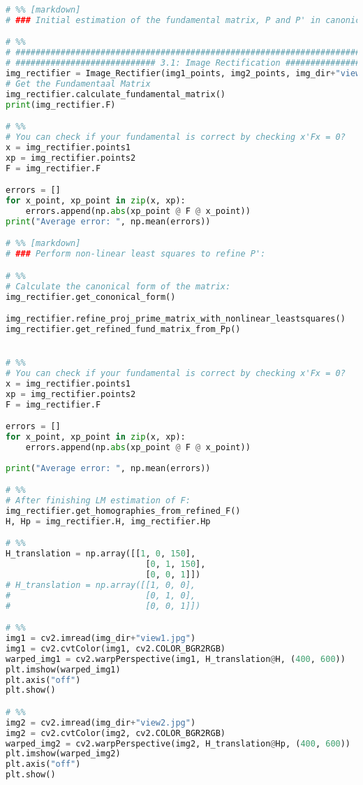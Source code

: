 \documentclass{article}
\begin{document}
\begin{lstlisting}[language=Python]
# %% [markdown]
# ### Initial estimation of the fundamental matrix, P and P' in canonical form

# %%
# ################################################################################################
# ############################ 3.1: Image Rectification ##########################################
img_rectifier = Image_Rectifier(img1_points, img2_points, img_dir+"view1.jpg", img_dir+"view2.jpg")
# Get the Fundamentaal Matrix
img_rectifier.calculate_fundamental_matrix()
print(img_rectifier.F)

# %%
# You can check if your fundamental is correct by checking x'Fx = 0?
x = img_rectifier.points1
xp = img_rectifier.points2
F = img_rectifier.F

errors = []
for x_point, xp_point in zip(x, xp):
    errors.append(np.abs(xp_point @ F @ x_point))
print("Average error: ", np.mean(errors))

# %% [markdown]
# ### Perform non-linear least squares to refine P':

# %%
# Calculate the canonical form of the matrix:
img_rectifier.get_cononical_form()

img_rectifier.refine_proj_prime_matrix_with_nonlinear_leastsquares()
img_rectifier.get_refined_fund_matrix_from_Pp()


# %%
# You can check if your fundamental is correct by checking x'Fx = 0?
x = img_rectifier.points1
xp = img_rectifier.points2
F = img_rectifier.F

errors = []
for x_point, xp_point in zip(x, xp):
    errors.append(np.abs(xp_point @ F @ x_point))
    
print("Average error: ", np.mean(errors))

# %%
# After finishing LM estimation of F:
img_rectifier.get_homographies_from_refined_F()
H, Hp = img_rectifier.H, img_rectifier.Hp

# %%
H_translation = np.array([[1, 0, 150],
                            [0, 1, 150],
                            [0, 0, 1]])
# H_translation = np.array([[1, 0, 0],
#                           [0, 1, 0],
#                           [0, 0, 1]])

# %%
img1 = cv2.imread(img_dir+"view1.jpg")
img1 = cv2.cvtColor(img1, cv2.COLOR_BGR2RGB)
warped_img1 = cv2.warpPerspective(img1, H_translation@H, (400, 600))
plt.imshow(warped_img1)
plt.axis("off")
plt.show()

# %%
img2 = cv2.imread(img_dir+"view2.jpg")
img2 = cv2.cvtColor(img2, cv2.COLOR_BGR2RGB)
warped_img2 = cv2.warpPerspective(img2, H_translation@Hp, (400, 600))
plt.imshow(warped_img2)
plt.axis("off")
plt.show()


\end{lstlisting}
\end{document}
